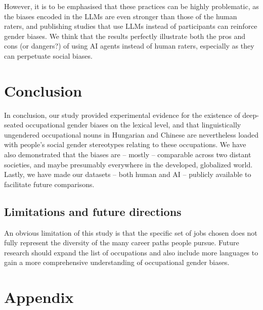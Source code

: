\documentclass[11pt]{article}
\begin{document}
However, it is to be emphasised that these practices can be highly problematic, as the biases encoded in the LLMs are even stronger than those of the human raters, and publishing studies that use LLMs instead of participants can reinforce gender biases. We think that the results perfectly illustrate both the pros and cons (or dangers?) of using AI agents instead of human raters, especially as they can perpetuate social biases.



\section{Conclusion}

In conclusion, our study provided experimental evidence for the existence of deep-seated occupational gender biases on the lexical level, and that linguistically ungendered occupational nouns in Hungarian and Chinese are nevertheless loaded with people's social gender stereotypes relating to these occupations. We have also demonstrated that the biases are -- mostly -- comparable across two distant societies, and maybe presumably everywhere in the developed, globalized world. Lastly, we have made our datasets -- both human and AI -- publicly available to facilitate future comparisons.

\subsection{Limitations and future directions}

An obvious limitation of this study is that the specific set of jobs chosen does not fully represent the diversity of the many career paths people pursue. Future research should expand the list of occupations and also include more languages to gain a more comprehensive understanding of occupational gender biases. 




%


\appendix

\section{Appendix}
\label{sec:appendix}
\end{document}
